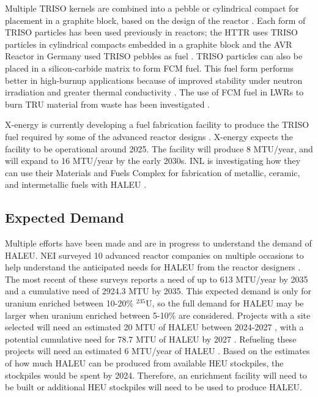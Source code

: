 Multiple \gls{TRISO} kernels are combined into a pebble or 
cylindrical compact for placement in a graphite block, based on the 
design of the reactor \cite{demkowicz_coated_2019}. Each form of 
\gls{TRISO} particles has been used previously in reactors; the \gls{HTTR}
uses 
\gls{TRISO} particles in cylindrical compacts embedded in a graphite block 
\cite{shiozawa_overview_2004} and the AVR Reactor in Germany used 
\gls{TRISO} pebbles as fuel \cite{gottaut_results_1990}.
\gls{TRISO} particles can also be placed in a silicon-carbide matrix 
to form \gls{FCM} fuel. This fuel form performs better in high-burnup 
applications because of improved stability under neutron irradiation and 
greater thermal conductivity \cite{snead_fully_2011}. The use of 
\gls{FCM} fuel in \glspl{LWR} to burn \gls{TRU} material from waste 
has been investigated \cite{snead_fully_2011,venneri_fully_2011}. 

X-energy is currently developing a fuel fabrication facility to 
produce the \gls{TRISO} fuel required by some of the advanced 
reactor designs \cite{noauthor_triso-x_2022}. X-energy expects the 
facility to be operational around 2025. The facility will 
produce 8 MTU/year, and will expand to 16 MTU/year 
by the early 2030s. \gls{INL} is investigating 
how they can use their Materials and Fuels Complex for 
fabrication of metallic, ceramic, and intermetallic fuels with 
\gls{HALEU} \cite{crawford_fuel_2019}. 

\subsection{Expected Demand}
Multiple efforts have been made and are in progress to understand the 
demand of \gls{HALEU}. \gls{NEI} surveyed 10 advanced reactor 
companies on multiple occasions to help understand the anticipated needs
for \gls{HALEU} from the reactor designers 
\cite{korsnick_need_2018,korsnick_updated_2020,korsnick_updated_2021}. 
The most recent of these surveys \cite{korsnick_updated_2021} reports 
a need of up to 613 MTU/year by 2035 and a cumulative need of 2924.3 MTU 
by 2035. This expected demand is only for uranium enriched between 10-20\%
$^{235}$U, so the full demand for \gls{HALEU} may be larger when uranium 
enriched between 5-10\% are considered. Projects with a site selected 
will need an estimated 20 MTU of \gls{HALEU} between 2024-2027 
\cite{nuclear_energy_institute_establishing_2022}, with a potential cumulative 
need for 78.7 MTU of \gls{HALEU} by 2027 \cite{korsnick_updated_2021}. 
Refueling these projects will need an estimated 6 MTU/year of 
\gls{HALEU} \cite{nuclear_energy_institute_establishing_2022}. Based 
on the estimates of how much \gls{HALEU} can be produced from available 
\gls{HEU} stockpiles, the stockpiles would be spent by 2024. Therefore, 
an enrichment facility will need to be built or additional \gls{HEU} 
stockpiles will need to be used to produce \gls{HALEU}.

